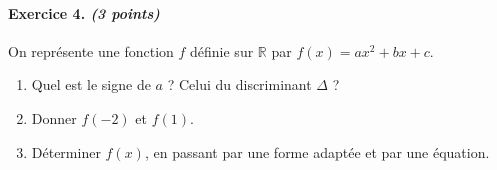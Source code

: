 \documentclass[11pt]{article}
\begin{document}
\paragraph{Exercice 4. \emph{(3 points)}}
On représente une fonction $f$ définie sur $\mathbb{R}$ par $f(x)=ax^2+bx+c$.
\begin{center}
\end{center}
\begin{enumerate}
  \item Quel est le signe de $a$ ? Celui du discriminant $\Delta$ ?
  \item Donner $f(-2)$ et $f(1)$.
  \item Déterminer $f(x)$, en passant par une forme adaptée et par une équation.
\end{enumerate}
\end{document}
